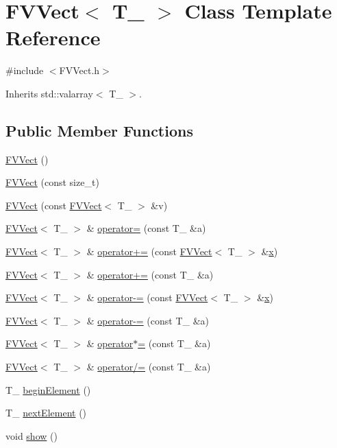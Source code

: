 \hypertarget{classFVVect}{
\section{FVVect$<$ T\_\- $>$ Class Template Reference}
\label{da/d83/classFVVect}
}


{\ttfamily \#include $<$FVVect.h$>$}



Inherits std::valarray$<$ T\_\- $>$.

\subsection*{Public Member Functions}
\begin{DoxyCompactItemize}
\item 
\hyperlink{classFVVect_a0d80f50251de9133bf7d8d2777483267}{FVVect} ()
\item 
\hyperlink{classFVVect_a3fb31edcc8fe2f459bc989b155c69642}{FVVect} (const size\_\-t)
\item 
\hyperlink{classFVVect_a3593eecb9c9e922de3ba16bd625871e4}{FVVect} (const \hyperlink{classFVVect}{FVVect}$<$ T\_\- $>$ \&v)
\item 
\hyperlink{classFVVect}{FVVect}$<$ T\_\- $>$ \& \hyperlink{classFVVect_a42f0279481f20b0770082afa7fe0b1a8}{operator=} (const T\_\- \&a)
\item 
\hyperlink{classFVVect}{FVVect}$<$ T\_\- $>$ \& \hyperlink{classFVVect_a753de7456375015eed8cf1c96e24b331}{operator+=} (const \hyperlink{classFVVect}{FVVect}$<$ T\_\- $>$ \&\hyperlink{FVL_2FVPoint2D_8h_a9a4f74af87a76a4c3dcb729cb0e68f8d}{x})
\item 
\hyperlink{classFVVect}{FVVect}$<$ T\_\- $>$ \& \hyperlink{classFVVect_ab19d5457b29197edc18bcb742321ca34}{operator+=} (const T\_\- \&a)
\item 
\hyperlink{classFVVect}{FVVect}$<$ T\_\- $>$ \& \hyperlink{classFVVect_a6c3a62a3fcc8ead29c7e22694e2bd63a}{operator-\/=} (const \hyperlink{classFVVect}{FVVect}$<$ T\_\- $>$ \&\hyperlink{FVL_2FVPoint2D_8h_a9a4f74af87a76a4c3dcb729cb0e68f8d}{x})
\item 
\hyperlink{classFVVect}{FVVect}$<$ T\_\- $>$ \& \hyperlink{classFVVect_a32ec0b9f4bb1e108764615135131a42e}{operator-\/=} (const T\_\- \&a)
\item 
\hyperlink{classFVVect}{FVVect}$<$ T\_\- $>$ \& \hyperlink{classFVVect_ab1d4c101403d690214f89b8a984fa322}{operator$\ast$=} (const T\_\- \&a)
\item 
\hyperlink{classFVVect}{FVVect}$<$ T\_\- $>$ \& \hyperlink{classFVVect_a5f018a2392b5b74ecff8ae133b461ae2}{operator/=} (const T\_\- \&a)
\item 
T\_\- \hyperlink{classFVVect_a69e15360d6a76b03d874b118c03e47ae}{beginElement} ()
\item 
T\_\- \hyperlink{classFVVect_a9e0d666fe09383e5c4cb6e45516394cf}{nextElement} ()
\item 
void \hyperlink{classFVVect_a4b148f40a95444d5669406b918ad2f52}{show} ()
\end{DoxyCompactItemize}
